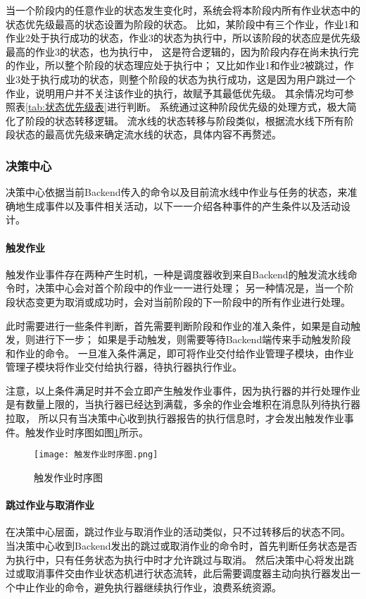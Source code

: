 当一个阶段内的任意作业的状态发生变化时，系统会将本阶段内所有作业状态中的状态优先级最高的状态设置为阶段的状态。
比如，某阶段中有三个作业，作业1和作业2处于执行成功的状态，作业3的状态为执行中，所以该阶段的状态应是优先级最高的作业3的状态，也为执行中，
这是符合逻辑的，因为阶段内存在尚未执行完的作业，所以整个阶段的状态理应处于执行中；
又比如作业1和作业2被跳过，作业3处于执行成功的状态，则整个阶段的状态为执行成功，这是因为用户跳过一个作业，说明用户并不关注该作业的执行，故赋予其最低优先级。
其余情况均可参照表\ref{tab:状态优先级表}进行判断。
系统通过这种阶段优先级的处理方式，极大简化了阶段的状态转移逻辑。
流水线的状态转移与阶段类似，根据流水线下所有阶段状态的最高优先级来确定流水线的状态，具体内容不再赘述。

\subsubsection{决策中心}
决策中心依据当前Backend传入的命令以及目前流水线中作业与任务的状态，来准确地生成事件以及事件相关活动，以下一一介绍各种事件的产生条件以及活动设计。

\paragraph{触发作业}
触发作业事件存在两种产生时机，一种是调度器收到来自Backend的触发流水线命令时，决策中心会对首个阶段中的作业一一进行处理；
另一种情况是，当一个阶段状态变更为取消或成功时，会对当前阶段的下一阶段中的所有作业进行处理。

此时需要进行一些条件判断，首先需要判断阶段和作业的准入条件，如果是自动触发，则进行下一步；
如果是手动触发，则需要等待Backend端传来手动触发阶段和作业的命令。
一旦准入条件满足，即可将作业交付给作业管理子模块，由作业管理子模块将作业交付给执行器，待执行器执行作业。

注意，以上条件满足时并不会立即产生触发作业事件，因为执行器的并行处理作业是有数量上限的，当执行器已经达到满载，多余的作业会堆积在消息队列待执行器拉取，
所以只有当决策中心收到执行器报告的执行信息时，才会发出触发作业事件。触发作业时序图如图\ref{fig:触发作业时序图}所示。

\begin{figure}[h]
  \centering
  \texttt{[image: 触发作业时序图.png]}
  \caption{触发作业时序图}
  \label{fig:触发作业时序图}
\end{figure}

\paragraph{跳过作业与取消作业}
在决策中心层面，跳过作业与取消作业的活动类似，只不过转移后的状态不同。
当决策中心收到Backend发出的跳过或取消作业的命令时，首先判断任务状态是否为执行中，只有任务状态为执行中时才允许跳过与取消。
然后决策中心将发出跳过或取消事件交由作业状态机进行状态流转，此后需要调度器主动向执行器发出一个中止作业的命令，避免执行器继续执行作业，浪费系统资源。

